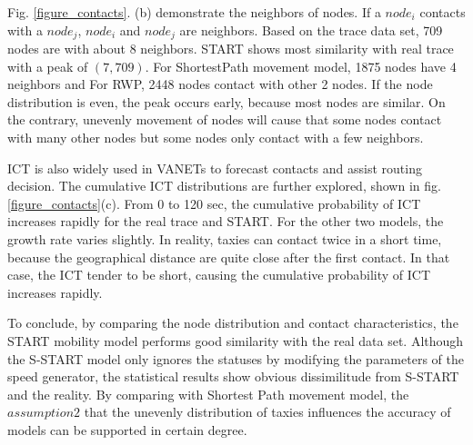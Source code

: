 Fig. \ref{figure_contacts}. (b) demonstrate the neighbors of nodes. If a $node_i$ contacts with a $node_j$, $node_i$ and $node_j$ are neighbors. Based on the trace data set, 709 nodes are with about 8 neighbors. START shows most similarity with real trace with a peak of  $(7,709)$.  For ShortestPath movement model, 1875 nodes have 4 neighbors and For RWP, 2448 nodes contact with other 2 nodes. If the node distribution is even, the peak occurs early, because most nodes are similar. On the contrary, unevenly movement of nodes will cause that some nodes contact with many other nodes but some nodes only contact with a few neighbors.

ICT is also widely used in VANETs to forecast contacts and assist routing decision. The cumulative ICT distributions are further explored, shown in fig.\ref{figure_contacts}(c).
From 0 to 120 sec, the cumulative probability of ICT increases rapidly for the real trace and START. For the other two models, the growth rate varies slightly. In reality, taxies can contact twice in a short time, because the geographical distance are quite close after the first contact. In that case, the ICT tender to be short, causing the cumulative probability of ICT increases rapidly.

To conclude, by comparing the node distribution and contact characteristics, the START mobility model performs good similarity with the real data set. Although the S-START model only ignores the statuses by modifying the parameters of the speed generator, the statistical results show obvious dissimilitude from S-START and the reality. By comparing with Shortest Path movement model, the $assumption 2$ that the unevenly distribution of taxies influences the accuracy of models can be supported in certain degree.

